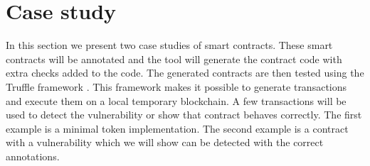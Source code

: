 \documentclass[a4paper]{article}
\begin{document}
\newpage
\section{Case study}
\label{sec:casestudy}
In this section we present two case studies of smart contracts. These smart contracts will be annotated and the tool will generate the contract code with extra checks added to the code. The generated contracts are then tested using the Truffle framework \cite{truffleframework}. This framework makes it possible to generate transactions and execute them on a local temporary blockchain. A few transactions will be used to detect the vulnerability or show that contract behaves correctly. The first example is a minimal token implementation. The second example is a contract with a vulnerability which we will show can be detected with the correct annotations.
\end{document}
